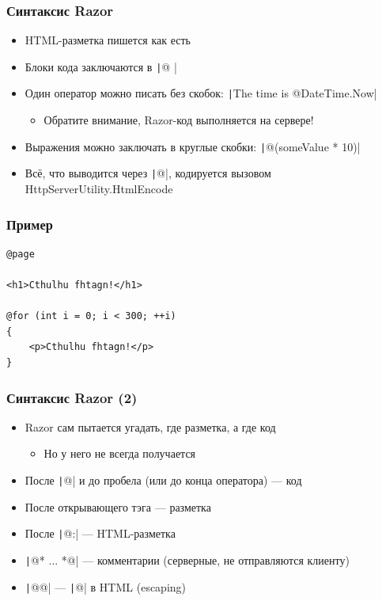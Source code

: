 \documentclass[xetex,mathserif,serif]{beamer}
\begin{document}
	\begin{frame}
		\frametitle{Синтаксис Razor}
		\begin{itemize}
			\item HTML-разметка пишется как есть
			\item Блоки кода заключаются в \texttt|@{ }|
			\item Один оператор можно писать без скобок: \texttt|The time is @DateTime.Now|
			\begin{itemize}
				\item Обратите внимание, Razor-код выполняется на сервере!
			\end{itemize}
			\item Выражения можно заключать в круглые скобки: \texttt|@(someValue * 10)|
			\item Всё, что выводится через \texttt|@|, кодируется вызовом HttpServerUtility.HtmlEncode
		\end{itemize}
	\end{frame}

	\begin{frame}[fragile]
		\frametitle{Пример}
		\begin{verbatim}
@page

<h1>Cthulhu fhtagn!</h1>

@for (int i = 0; i < 300; ++i)
{
    <p>Cthulhu fhtagn!</p>
}
		\end{verbatim}
	\end{frame}

	\begin{frame}
		\frametitle{Синтаксис Razor (2)}
		\begin{itemize}
			\item Razor сам пытается угадать, где разметка, а где код
			\begin{itemize}
				\item Но у него не всегда получается
			\end{itemize}
			\item После \texttt|@| и до пробела (или до конца оператора) --- код
			\item После открывающего тэга --- разметка
			\item После \texttt|@:| --- HTML-разметка
			\item \texttt|@* ... *@| --- комментарии (серверные, не отправляются клиенту)
			\item \texttt|@@| --- \texttt|@| в HTML (escaping)
		\end{itemize}
	\end{frame}
\end{document}

